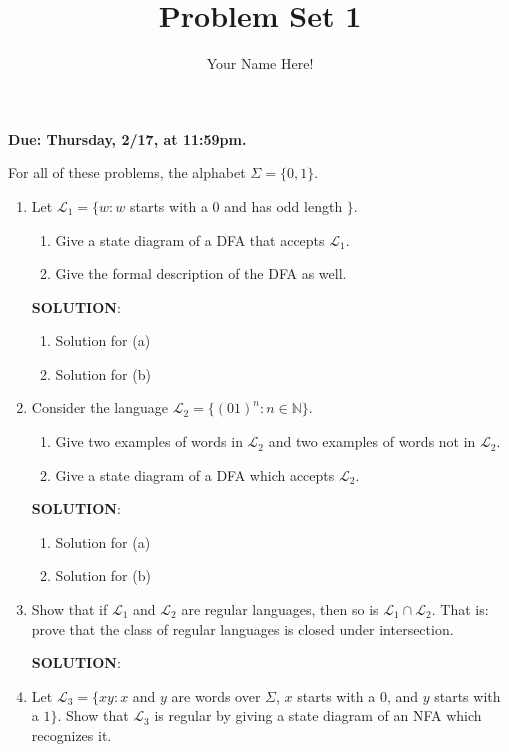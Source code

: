 \documentclass[12pt]{article}
\title{Problem Set 1}
\author{Your Name Here!}
\date{}
\newcommand{\sol}{\par{\bf SOLUTION}: }
\begin{document}
\maketitle

\noindent
    {\bf Due: Thursday, 2/17, at 11:59pm. }
        
For all of these problems, the alphabet $\Sigma = \{ 0, 1 \}$.
    
\begin{enumerate}
\item Let $\mathcal{L}_1 = \{ w : w$ starts with a 0 and has odd length $\}$.
    \begin{enumerate}
    \item Give a state diagram of a DFA that accepts $\mathcal{L}_1$.
    \item Give the formal description of the DFA as well.
    \end{enumerate} 

\sol %
\begin{enumerate}
	\item Solution for (a)
	\item Solution for (b)
\end{enumerate}
    
\item Consider the language $\mathcal{L}_2 = \{ (01)^n : n \in \mathbb{N} \}$.
\begin{enumerate}
	\item Give two examples of words in $\mathcal{L}_2$ and two examples of words not in $\mathcal{L}_2$.
	\item Give a state diagram of a DFA which accepts $\mathcal{L}_2$.
\end{enumerate}

\sol %
\begin{enumerate}
	\item Solution for (a)
	\item Solution for (b)
\end{enumerate}

\item Show that if $\mathcal{L}_1$ and $\mathcal{L}_2$ are regular languages, then so is $\mathcal{L}_1 \cap \mathcal{L}_2$. That is: prove that the class of regular languages is closed under intersection.

\sol %


\item \label{l4} Let $\mathcal{L}_3 = \{ xy : x$ and $y$ are words over $\Sigma$, $x$ starts with a $0$, and $y$ starts with a $1 \}.$ Show that $\mathcal{L}_3$ is regular by giving a state diagram of an NFA which recognizes it.


\end{enumerate}
\end{document}
